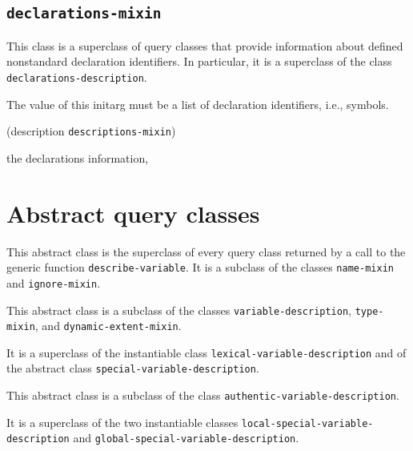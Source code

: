 \subsection{\texttt{declarations-mixin}}
\label{sec-declarations-mixin}

{\footnotesize
{}
}

This class is a superclass of query classes that provide information
about defined nonstandard declaration identifiers. In particular, it
is a superclass of the class \texttt{declarations-description}.

{\footnotesize
{}
}

The value of this initarg must be a list of declaration identifiers,
i.e., symbols.

{\footnotesize
{} {(description {\tt descriptions-mixin})}
}

 the declarations information, 

\section{Abstract query classes}

{\footnotesize
{}
}

This abstract class is the superclass of every query class returned by
a call to the generic function \texttt{describe-variable}.  It is a
subclass of the classes \texttt{name-mixin} and \texttt{ignore-mixin}.

{\footnotesize
{}
}

This abstract class is a subclass of the classes
\texttt{variable-description}, \texttt{type-mixin}, and
\texttt{dynamic-extent-mixin}.

It is a superclass of the instantiable class
\texttt{lexical-variable-description} and of the abstract class
\texttt{special-variable-description}.

{\footnotesize
{}
}

This abstract class is a subclass of the class
\texttt{authentic-variable-description}.

It is a superclass of the two instantiable classes
\texttt{local-special-variable-description} and
\texttt{global-special-variable-description}.

{\footnotesize
{}
}

